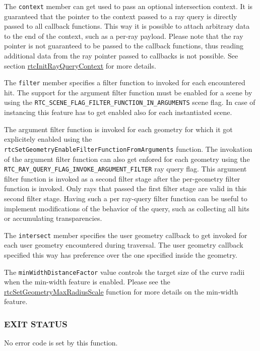 The \texttt{context} member can get used to pass an optional
intersection context. It is guaranteed that the pointer to the context
passed to a ray query is directly passed to all callback functions. This
way it is possible to attach arbitrary data to the end of the context,
such as a per-ray payload. Please note that the ray pointer is not
guaranteed to be passed to the callback functions, thus reading
additional data from the ray pointer passed to callbacks is not
possible. See section
\hyperref[rtcinitrayquerycontext]{rtcInitRayQueryContext} for more
details.

The \texttt{filter} member specifies a filter function to invoked for
each encountered hit. The support for the argument filter function must
be enabled for a scene by using the
\texttt{RTC\_SCENE\_FLAG\_FILTER\_FUNCTION\_IN\_ARGUMENTS} scene flag.
In case of instancing this feature has to get enabled also for each
instantiated scene.

The argument filter function is invoked for each geometry for which it
got explicitely enabled using the
\texttt{rtcSetGeometryEnableFilterFunctionFromArguments} function. The
invokation of the argument filter function can also get enfored for each
geometry using the
\texttt{RTC\_RAY\_QUERY\_FLAG\_INVOKE\_ARGUMENT\_FILTER} ray query flag.
This argument filter function is invoked as a second filter stage after
the per-geometry filter function is invoked. Only rays that passed the
first filter stage are valid in this second filter stage. Having such a
per ray-query filter function can be useful to implement modifications
of the behavior of the query, such as collecting all hits or
accumulating transparencies.

The \texttt{intersect} member specifies the user geometry callback to
get invoked for each user geometry encountered during traversal. The
user geometry callback specified this way has preference over the one
specified inside the geometry.

The \texttt{minWidthDistanceFactor} value controls the target size of
the curve radii when the min-width feature is enabled. Please see the
\hyperref[rtcsetgeometrymaxradiusscale]{rtcSetGeometryMaxRadiusScale}
function for more details on the min-width feature.

\subsubsection{EXIT STATUS}\label{exit-status}

No error code is set by this function.

